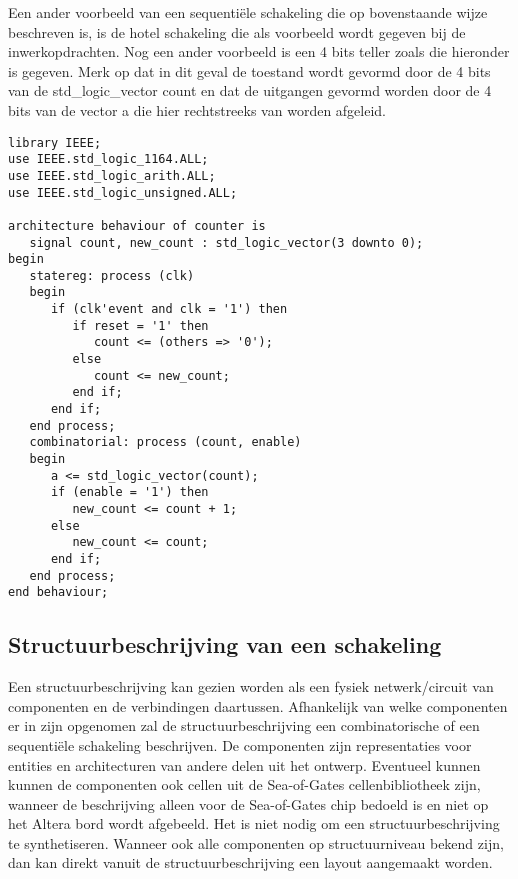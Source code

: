 Een ander voorbeeld van een 
sequenti\"ele schakeling die op bovenstaande wijze beschreven is,
is de hotel schakeling die als voorbeeld wordt gegeven
bij de inwerkopdrachten.
Nog een ander voorbeeld is een 4 bits teller zoals die hieronder is gegeven.
Merk op dat in dit geval de toestand wordt gevormd door 
de 4 bits van de std\_logic\_vector count
en dat de uitgangen gevormd worden door de 4 bits van
de vector a die hier rechtstreeks van worden afgeleid.
\begin{verbatim}
library IEEE;
use IEEE.std_logic_1164.ALL;
use IEEE.std_logic_arith.ALL;
use IEEE.std_logic_unsigned.ALL;

architecture behaviour of counter is
   signal count, new_count : std_logic_vector(3 downto 0);
begin
   statereg: process (clk)
   begin
      if (clk'event and clk = '1') then
         if reset = '1' then
            count <= (others => '0');
         else
            count <= new_count;
         end if;
      end if;
   end process;
   combinatorial: process (count, enable)
   begin
      a <= std_logic_vector(count);
      if (enable = '1') then
         new_count <= count + 1;
      else
         new_count <= count;
      end if;
   end process;
end behaviour;
\end{verbatim}

\subsection{Structuurbeschrijving van een schakeling}

Een structuurbeschrijving kan gezien worden als een
fysiek netwerk/circuit van componenten en de verbindingen
daartussen.
Afhankelijk van welke componenten er in zijn opgenomen
zal de structuurbeschrijving een combinatorische
of een sequenti\"ele schakeling beschrijven.
De componenten zijn representaties voor entities en
architecturen van andere delen
uit het ontwerp.
Eventueel kunnen kunnen de componenten ook
cellen uit de Sea-of-Gates cellenbibliotheek zijn,
wanneer de beschrijving alleen voor de Sea-of-Gates chip 
bedoeld is en niet op het Altera bord wordt afgebeeld.
Het is niet nodig om een structuurbeschrijving te synthetiseren.
Wanneer ook alle componenten op structuurniveau bekend zijn, 
dan kan direkt vanuit de structuurbeschrijving een layout 
aangemaakt worden.

